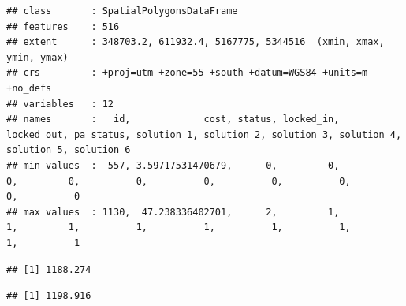 \documentclass[12pt,]{book}
\newenvironment{Shaded}{\begin{snugshade}}{\end{snugshade}}
\newcommand{\CommentTok}[1]{\textcolor[rgb]{0.56,0.35,0.01}{\textit{#1}}}
\newcommand{\DecValTok}[1]{\textcolor[rgb]{0.00,0.00,0.81}{#1}}
\newcommand{\KeywordTok}[1]{\textcolor[rgb]{0.13,0.29,0.53}{\textbf{#1}}}
\newcommand{\NormalTok}[1]{#1}
\newcommand{\OperatorTok}[1]{\textcolor[rgb]{0.81,0.36,0.00}{\textbf{#1}}}
\newcommand{\StringTok}[1]{\textcolor[rgb]{0.31,0.60,0.02}{#1}}
\begin{document}
\begin{verbatim}
## class       : SpatialPolygonsDataFrame 
## features    : 516 
## extent      : 348703.2, 611932.4, 5167775, 5344516  (xmin, xmax, ymin, ymax)
## crs         : +proj=utm +zone=55 +south +datum=WGS84 +units=m +no_defs 
## variables   : 12
## names       :   id,             cost, status, locked_in, locked_out, pa_status, solution_1, solution_2, solution_3, solution_4, solution_5, solution_6 
## min values  :  557, 3.59717531470679,      0,         0,          0,         0,          0,          0,          0,          0,          0,          0 
## max values  : 1130,  47.238336402701,      2,         1,          1,         1,          1,          1,          1,          1,          1,          1
\end{verbatim}

\begin{Shaded}
\end{Shaded}

\begin{verbatim}
## [1] 1188.274
\end{verbatim}

\begin{Shaded}
\end{Shaded}

\begin{verbatim}
## [1] 1198.916
\end{verbatim}

\begin{Shaded}
\end{Shaded}
\end{document}
